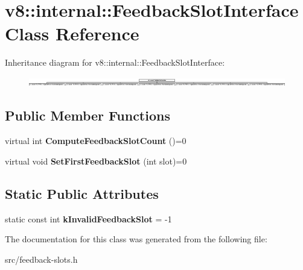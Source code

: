 \hypertarget{classv8_1_1internal_1_1_feedback_slot_interface}{}\section{v8\+:\+:internal\+:\+:Feedback\+Slot\+Interface Class Reference}
\label{classv8_1_1internal_1_1_feedback_slot_interface}
Inheritance diagram for v8\+:\+:internal\+:\+:Feedback\+Slot\+Interface\+:\begin{figure}[H]
\begin{center}
\leavevmode
\includegraphics[height=0.408163cm]{classv8_1_1internal_1_1_feedback_slot_interface}
\end{center}
\end{figure}
\subsection*{Public Member Functions}
\begin{DoxyCompactItemize}
\item 
\hypertarget{classv8_1_1internal_1_1_feedback_slot_interface_a8d5458be36bf053cd446a6126f3f93d9}{}virtual int {\bfseries Compute\+Feedback\+Slot\+Count} ()=0\label{classv8_1_1internal_1_1_feedback_slot_interface_a8d5458be36bf053cd446a6126f3f93d9}

\item 
\hypertarget{classv8_1_1internal_1_1_feedback_slot_interface_a69db4fab9a3f04b249cee62eb16b489a}{}virtual void {\bfseries Set\+First\+Feedback\+Slot} (int slot)=0\label{classv8_1_1internal_1_1_feedback_slot_interface_a69db4fab9a3f04b249cee62eb16b489a}

\end{DoxyCompactItemize}
\subsection*{Static Public Attributes}
\begin{DoxyCompactItemize}
\item 
\hypertarget{classv8_1_1internal_1_1_feedback_slot_interface_a1490ea6e7078f7b287ef5083aca9e4cf}{}static const int {\bfseries k\+Invalid\+Feedback\+Slot} = -\/1\label{classv8_1_1internal_1_1_feedback_slot_interface_a1490ea6e7078f7b287ef5083aca9e4cf}

\end{DoxyCompactItemize}


The documentation for this class was generated from the following file\+:\begin{DoxyCompactItemize}
\item 
src/feedback-\/slots.\+h\end{DoxyCompactItemize}
